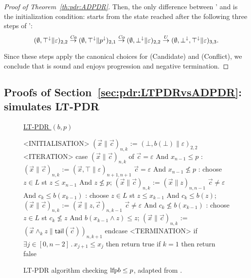 \begin{proof}[Proof of Theorem~\ref{th:pdr:ADPDR}]
	Then, the only difference between {\APDR'} and {\ADPDR} is the initialization condition:  {\ADPDR} starts from the state reached after the following three steps of  {\APDR'}:
	\[
	(\emptyset,\top^\downarrow\|\varepsilon)_{2,2}
	\stackrel{\mathit{Ca}}{\to} (\emptyset,\top^\downarrow\|p^\downarrow)_{2,1}
	\stackrel{\mathit{Co}}{\to} (\emptyset,\bot^\downarrow\|\varepsilon)_{2,2}
	\stackrel{U}{\to} (\emptyset,\bot^\downarrow,\top^\downarrow\|\varepsilon)_{3,3}\textrm{.}
	\]

	Since these steps apply the canonical choices for (Candidate) and (Conflict), we conclude that {\ADPDR} is sound and enjoys progression and negative termination.
\end{proof}

\subsection{Proofs of Section~\ref{sec:pdr:LTPDRvsADPDR}: {\ADPDR} simulates LT-PDR}

\begin{figure}[t]
	\centering
	\underline{LT-PDR $(b,p)$}
	\begin{codeNT}
<INITIALISATION>
  $( \vec{x} \| \vec{c} )_{n,k}$ := $(\bot,b(\bot)\|\varepsilon)_{2,2}$
<ITERATION>
  case $( \vec{x} \| \vec{c} )_{n,k}$ of
	   $\vec{c}=\varepsilon$ And $x_{n-1} \leq p$     :                    %
			$( \vec{x} \| \vec{c} )_{n,k}$ := $( \vec{x}, \top \| \varepsilon )_{n+1,n+1}$
	   $\vec{c}=\varepsilon$ And $x_{n-1} \not \leq p$    :                     %
			choose $z\in L$ st  $z \leq x_{n-1}$ And  $z \not\leq p$;
			$( \vec{x} \| \vec{c} )_{n,k}$ := $( \vec{x} \| z )_{n,n-1}$
	   $\vec{c} \neq \varepsilon$ And $c_k \leq b(x_{k-1})$ :                        %
			choose $z \in L$ st $z \leq x_{k-1}$ And $c_k \leq b(z)$;
			$(\vec{x} \| \vec{c} )_{n,k}$ := $(\vec{x} \| z , \vec{c} )_{n,k-1}$
	   $\vec{c} \neq \varepsilon$ And $c_k \not \leq b(x_{k-1})$ :                        %
			choose $z \in L$ st $c_k \not \leq z$ And $b(x_{k-1} \land z) \leq z$;
			$(\vec{x} \| \vec{c} )_{n,k}$ := $(\vec{x} \land_k z \| \mathsf{tail}(\vec{c}) )_{n,k+1}$
  endcase
<TERMINATION>
	if $\exists j\in [0,n-2]\,.\, x_{j+1} \leq x_j$ then return true 		%
	if $k = 1$ then return false							%
\end{codeNT}
	\caption{LT-PDR algorithm checking $\text{lfp} b \leq p$, adapted from \cite{KUKSH22}.}
	\label{fig:app:LTPDR2}
\end{figure}

